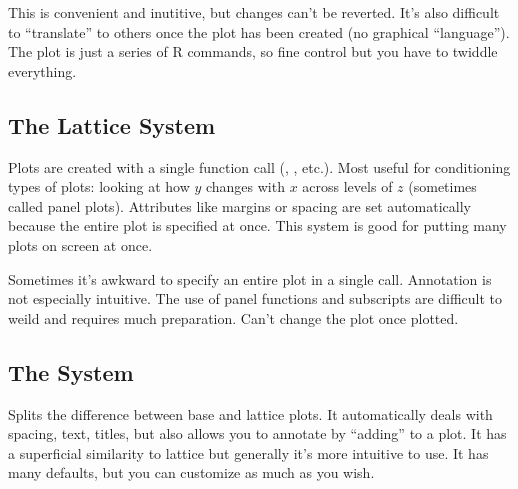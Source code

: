 This is convenient and inutitive, but changes can't be reverted. It's also difficult to ``translate'' to others once the plot has been created (no graphical ``language''). The plot is just a series of R commands, so fine control but you have to twiddle everything.

\subsection*{The Lattice System}
Plots are created with a single function call (, , etc.). Most useful for conditioning types of plots: looking at how $y$ changes with $x$ across levels of $z$ (sometimes called panel plots). Attributes like margins or spacing are set automatically because the entire plot is specified at once. This system is good for putting many plots on screen at once.

Sometimes it's awkward to specify an entire plot in a single call. Annotation is not especially intuitive. The use of panel functions and subscripts are difficult to weild and requires much preparation. Can't change the plot once plotted.

\subsection*{The  System}
Splits the difference between base and lattice plots. It automatically deals with spacing, text, titles, but also allows you to annotate by ``adding'' to a plot. It has a superficial similarity to lattice but generally it's more intuitive to use. It has many defaults, but you can customize as much as you wish.





